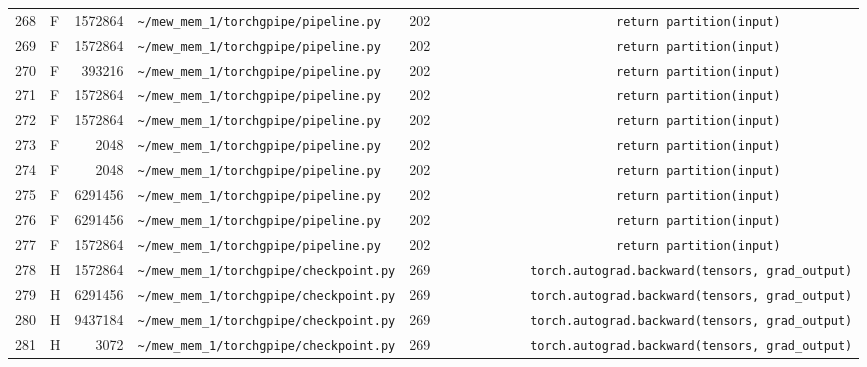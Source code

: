 \documentclass{article}
\begin{document}
\begin{longtable}{r l r p{6.5cm} r p{7.0cm}}
268 & F & 1572864 & \lstinline|~/mew_mem_1/torchgpipe/pipeline.py| & 202 & \lstinline|                        return partition(input)| \\
269 & F & 1572864 & \lstinline|~/mew_mem_1/torchgpipe/pipeline.py| & 202 & \lstinline|                        return partition(input)| \\
270 & F & 393216 & \lstinline|~/mew_mem_1/torchgpipe/pipeline.py| & 202 & \lstinline|                        return partition(input)| \\
271 & F & 1572864 & \lstinline|~/mew_mem_1/torchgpipe/pipeline.py| & 202 & \lstinline|                        return partition(input)| \\
272 & F & 1572864 & \lstinline|~/mew_mem_1/torchgpipe/pipeline.py| & 202 & \lstinline|                        return partition(input)| \\
273 & F & 2048 & \lstinline|~/mew_mem_1/torchgpipe/pipeline.py| & 202 & \lstinline|                        return partition(input)| \\
274 & F & 2048 & \lstinline|~/mew_mem_1/torchgpipe/pipeline.py| & 202 & \lstinline|                        return partition(input)| \\
275 & F & 6291456 & \lstinline|~/mew_mem_1/torchgpipe/pipeline.py| & 202 & \lstinline|                        return partition(input)| \\
276 & F & 6291456 & \lstinline|~/mew_mem_1/torchgpipe/pipeline.py| & 202 & \lstinline|                        return partition(input)| \\
277 & F & 1572864 & \lstinline|~/mew_mem_1/torchgpipe/pipeline.py| & 202 & \lstinline|                        return partition(input)| \\
278 & H & 1572864 & \lstinline|~/mew_mem_1/torchgpipe/checkpoint.py| & 269 & \lstinline|            torch.autograd.backward(tensors, grad_output)| \\
279 & H & 6291456 & \lstinline|~/mew_mem_1/torchgpipe/checkpoint.py| & 269 & \lstinline|            torch.autograd.backward(tensors, grad_output)| \\
280 & H & 9437184 & \lstinline|~/mew_mem_1/torchgpipe/checkpoint.py| & 269 & \lstinline|            torch.autograd.backward(tensors, grad_output)| \\
281 & H & 3072 & \lstinline|~/mew_mem_1/torchgpipe/checkpoint.py| & 269 & \lstinline|            torch.autograd.backward(tensors, grad_output)| \\
\end{longtable}
\end{document}
